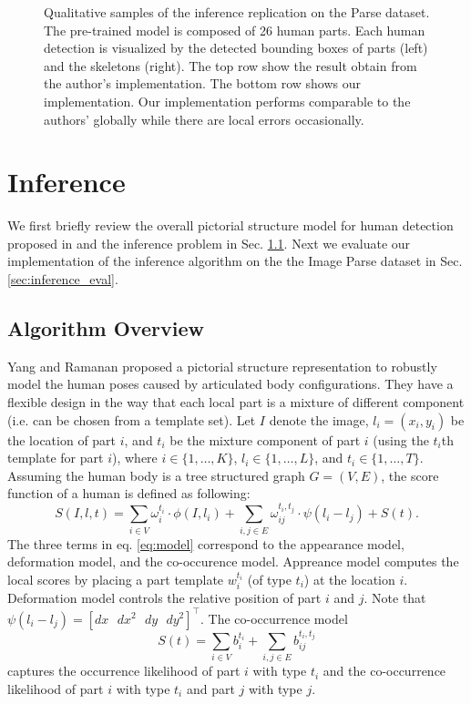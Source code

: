 \documentclass[10pt,twocolumn,letterpaper]{article}
\begin{document}
\begin{figure}[t]
\begin{center}
  \end{center}
  \caption{Qualitative samples of the inference replication on the Parse dataset. The pre-trained model is composed of 26 human parts. Each human detection is visualized by the detected bounding boxes of parts (left) and the skeletons (right). The top row show the result obtain from the author's implementation. The bottom row shows our implementation. Our implementation performs comparable to the authors' globally while there are local errors occasionally.}
  \label{fig:inference_exp}
\end{figure}


\section{Inference}
We first briefly review the overall pictorial structure model for human detection proposed in \cite{Yang_PAMI2011} and the inference problem in Sec. \ref{sec:inference_ov}. Next we evaluate our implementation of the inference algorithm on the the Image Parse dataset \cite{Ramanan_NIPS2006} in Sec. \ref{sec:inference_eval}.

\subsection{Algorithm Overview}
\label{sec:inference_ov}
Yang and Ramanan proposed a pictorial structure representation to robustly model the human poses caused by articulated body configurations. They have a flexible design in the way that each local part is a mixture of different component (i.e. can be chosen from a template set). Let $I$ denote the image, $l_i = (x_i, y_i)$ be the location of part $i$, and $t_i$ be the mixture component of part $i$ (using the $t_i$th template for part $i$), where $i\in \{1,\dots,K\}$, $l_i\in\{1,\dots,L\}$, and $t_i\in\{1,\dots,T\}$. Assuming the human body is a tree structured graph $G=(V,E)$, the score function of a human is defined as following:
\begin{equation}
\label{eq:model}
  S(I,l,t) = \sum_{i\in V}\omega_i^{t_i}\cdot\phi(I,l_i) + \sum_{i,j\in E}\omega_{ij}^{t_i,t_j}\cdot\psi(l_i-l_j) + S(t).
\end{equation}
The three terms in eq. \ref{eq:model} correspond to the appearance model, deformation model, and the co-occurence model. Appreance model computes the local scores by placing a part template $w_i^{t_i}$ (of type $t_i$) at the location $i$. Deformation model controls the relative position of part $i$ and $j$. Note that $\psi(l_i-l_j)=[dx\text{~~}dx^{2}\text{~~}dy\text{~~}dy^{2}]^{\top}$. The co-occurrence model 
\begin{equation}
  S(t) = \sum_{i\in V}b_i^{t_i} + \sum_{i,j\in E}b_{ij}^{t_i,t_j}
\end{equation}
captures the occurrence likelihood of part $i$ with type $t_i$ and the co-occurrence likelihood of part $i$ with type $t_i$ and part $j$ with type $j$.
\end{document}
